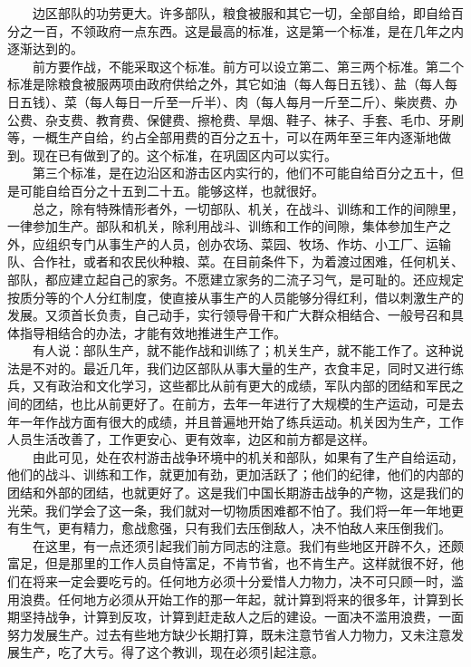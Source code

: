 \documentclass[cn,11pt,chinese]{elegantbook}
\begin{document}
　　边区部队的功劳更大。许多部队，粮食被服和其它一切，全部自给，即自给百分之一百，不领政府一点东西。这是最高的标准，这是第一个标准，是在几年之内逐渐达到的。\\
　　前方要作战，不能采取这个标准。前方可以设立第二、第三两个标准。第二个标准是除粮食被服两项由政府供给之外，其它如油（每人每日五钱）、盐（每人每日五钱）、菜（每人每日一斤至一斤半）、肉（每人每月一斤至二斤）、柴炭费、办公费、杂支费、教育费、保健费、擦枪费、旱烟、鞋子、袜子、手套、毛巾、牙刷等，一概生产自给，约占全部用费的百分之五十，可以在两年至三年内逐渐地做到。现在已有做到了的。这个标准，在巩固区内可以实行。\\
　　第三个标准，是在边沿区和游击区内实行的，他们不可能自给百分之五十，但是可能自给百分之十五到二十五。能够这样，也就很好。\\
　　总之，除有特殊情形者外，一切部队、机关，在战斗、训练和工作的间隙里，一律参加生产。部队和机关，除利用战斗、训练和工作的间隙，集体参加生产之外，应组织专门从事生产的人员，创办农场、菜园、牧场、作坊、小工厂、运输队、合作社，或者和农民伙种粮、菜。在目前条件下，为着渡过困难，任何机关、部队，都应建立起自己的家务。不愿建立家务的二流子习气，是可耻的。还应规定按质分等的个人分红制度，使直接从事生产的人员能够分得红利，借以刺激生产的发展。又须首长负责，自己动手，实行领导骨干和广大群众相结合、一般号召和具体指导相结合的办法，才能有效地推进生产工作。\\
　　有人说：部队生产，就不能作战和训练了；机关生产，就不能工作了。这种说法是不对的。最近几年，我们边区部队从事大量的生产，衣食丰足，同时又进行练兵，又有政治和文化学习，这些都比从前有更大的成绩，军队内部的团结和军民之间的团结，也比从前更好了。在前方，去年一年进行了大规模的生产运动，可是去年一年作战方面有很大的成绩，并且普遍地开始了练兵运动。机关因为生产，工作人员生活改善了，工作更安心、更有效率，边区和前方都是这样。\\
　　由此可见，处在农村游击战争环境中的机关和部队，如果有了生产自给运动，他们的战斗、训练和工作，就更加有劲，更加活跃了；他们的纪律，他们的内部的团结和外部的团结，也就更好了。这是我们中国长期游击战争的产物，这是我们的光荣。我们学会了这一条，我们就对一切物质困难都不怕了。我们将一年一年地更有生气，更有精力，愈战愈强，只有我们去压倒敌人，决不怕敌人来压倒我们。\\
　　在这里，有一点还须引起我们前方同志的注意。我们有些地区开辟不久，还颇富足，但是那里的工作人员自恃富足，不肯节省，也不肯生产。这样就很不好，他们在将来一定会要吃亏的。任何地方必须十分爱惜人力物力，决不可只顾一时，滥用浪费。任何地方必须从开始工作的那一年起，就计算到将来的很多年，计算到长期坚持战争，计算到反攻，计算到赶走敌人之后的建设。一面决不滥用浪费，一面努力发展生产。过去有些地方缺少长期打算，既未注意节省人力物力，又未注意发展生产，吃了大亏。得了这个教训，现在必须引起注意。\\
\end{document}

